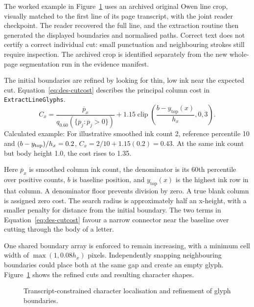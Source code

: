The worked example in Figure~\ref{fig:des-alignment} uses an archived original Owen line crop, visually matched to the first line of its page transcript, with the joint reader checkpoint. The reader recovered the full line, and the extraction routine then generated the displayed boundaries and normalised paths. Correct text does not certify a correct individual cut: small punctuation and neighbouring strokes still require inspection. The archived crop is identified separately from the new whole-page segmentation run in the evidence manifest.~\cite[project records; implementation]{brauneevidence2026,braunepipeline2026}

The initial boundaries are refined by looking for thin, low ink near the expected cut. Equation~\ref{eq:des-cutcost} describes the principal column cost in \texttt{ExtractLineGlyphs}.
\begin{equation}
C_x=\frac{\overline p_x}{q_{0.60}(\{\overline p_j:\overline p_j>0\})}
+1.15\operatorname{clip}\left(\frac{b-y_{\mathrm{top}}(x)}{h_x},0,3\right).
\label{eq:des-cutcost}
\end{equation}
Calculated example: For illustrative smoothed ink count 2, reference percentile 10 and $(b-y_{\rm top})/h_x=0.2$, $C_x=2/10+1.15(0.2)=0.43$. At the same ink count but body height 1.0, the cost rises to 1.35. \cite[style.py, ExtractLineGlyphs]{braunepipeline2026}

Here $\overline p_x$ is smoothed column ink count, the denominator is its 60th percentile over positive counts, $b$ is baseline position, and $y_{\mathrm{top}}(x)$ is the highest ink row in that column. A denominator floor prevents division by zero. A true blank column is assigned zero cost. The search radius is approximately half an x-height, with a smaller penalty for distance from the initial boundary. The two terms in Equation~\ref{eq:des-cutcost} favour a narrow connector near the baseline over cutting through the body of a letter.~\cite[style.py; synthesise.py; reproduce.py]{braunepipeline2026}

One shared boundary array is enforced to remain increasing, with a minimum cell width of $\max(1,0.08h_x)$ pixels. Independently snapping neighbouring boundaries could place both at the same gap and create an empty glyph. Figure~\ref{fig:des-alignment} shows the refined cuts and resulting character shapes.~\cite[style.py; synthesise.py]{braunepipeline2026}


\begin{figure}[!htbp]\centering
{}
\caption{Transcript-constrained character localisation and refinement of glyph boundaries.~\cite{brauneevidence2026,braunepipeline2026}}
\label{fig:des-alignment}
\end{figure}

